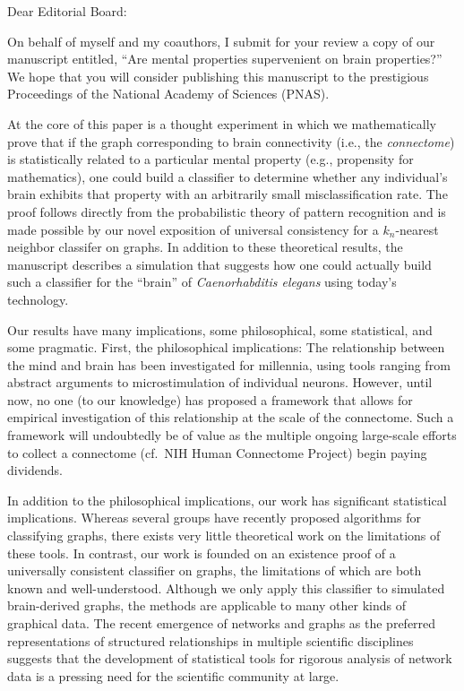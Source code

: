 \documentclass[10pt]{letter}
\date{\today}
\begin{document}
\begin{letter}{	%
}   
                           
\opening{Dear Editorial Board:}

On behalf of myself and my coauthors, I submit for your review a copy of our manuscript entitled, ``Are mental properties supervenient on brain properties?'' We hope that you will consider publishing this manuscript to the prestigious Proceedings of the National Academy of Sciences (PNAS).

At the core of this paper is a thought experiment in which we mathematically prove that if the graph corresponding to brain connectivity (i.e., the \emph{connectome}) is statistically related to a particular mental property (e.g., propensity for mathematics), one could build a classifier to determine whether any individual's brain exhibits that property with an arbitrarily small misclassification rate. The proof follows directly from the probabilistic theory of pattern recognition and is made possible by our novel exposition of universal consistency for a $k_n$-nearest neighbor classifer on graphs. In addition to these theoretical results, the manuscript describes a simulation that suggests how one could actually build such a classifier for the ``brain'' of \emph{Caenorhabditis elegans} using today's technology.

Our results have many implications, some philosophical, some statistical, and some pragmatic. First, the philosophical implications: The relationship between the mind and brain has been investigated for millennia, using tools ranging from abstract arguments to microstimulation of individual neurons. However, until now, no one (to our knowledge) has proposed a framework that allows for empirical investigation of this relationship at the scale of the connectome. Such a framework will undoubtedly be of value as the multiple ongoing large-scale efforts to collect a connectome (cf.\ NIH Human Connectome Project) begin paying dividends.

In addition to the philosophical implications, our work has significant statistical implications. Whereas several groups have recently proposed algorithms for classifying graphs, there exists very little theoretical work on the limitations of these tools. In contrast, our work is founded on an existence proof of a universally consistent classifier on graphs, the limitations of which are both known and well-understood. Although we only apply this classifier to simulated brain-derived graphs, the methods are applicable to many other kinds of graphical data. The recent emergence of networks and graphs as the preferred representations of structured relationships in multiple scientific disciplines suggests that the development of statistical tools for rigorous analysis of network data is a pressing need for the scientific community at large.


\end{letter}
\end{document}

